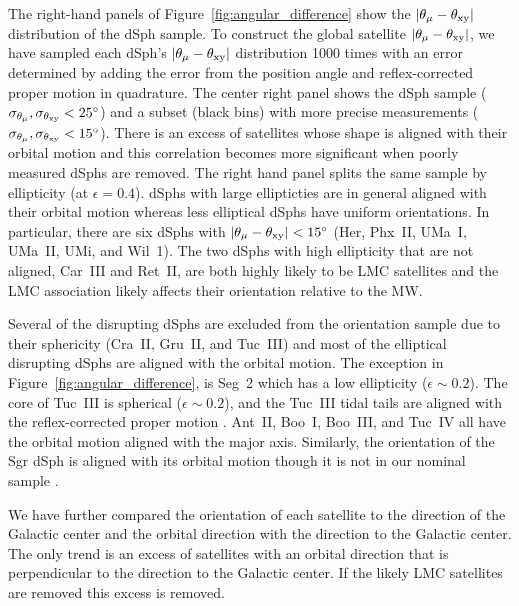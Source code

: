 \documentclass[twocolumn]{aastex63}
\newcommand{\degree}{\ensuremath{{}^{\circ}}\xspace}
\begin{document}
The right-hand panels of Figure~\ref{fig:angular_difference} show the $| \theta_{\mu}-\theta_{\rm xy} |$ distribution of the dSph sample.  To construct the global satellite $| \theta_{\mu}-\theta_{\rm xy} |$, we have sampled each dSph's  $| \theta_{\mu}-\theta_{\rm xy} |$ distribution  1000 times with an error determined by adding the error from the position angle and reflex-corrected proper motion in  quadrature.
The center right panel shows the  dSph sample  
($\sigma_{\theta_\mu}, \sigma_{\theta_{\rm xy}} < 25\degree$) and  a subset (black bins) with more precise measurements ($\sigma_{\theta_\mu}, \sigma_{\theta_{\rm xy}} < 15\degree$).
There is an excess of satellites whose shape is aligned with their orbital motion and this correlation becomes more significant when  poorly measured dSphs are removed.
The right hand panel splits the same sample by ellipticity (at $\epsilon=0.4$).
dSphs with large ellipticties  are in general aligned with their orbital motion whereas less elliptical dSphs have  uniform orientations. 
In particular, there are six dSphs with $| \theta_{\mu}-\theta_{\rm xy} |<15\degree$ (Her, Phx~II, UMa~I, UMa~II, UMi, and Wil~1). 
The  two dSphs with high ellipticity that are not aligned, Car~III and Ret~II, are both highly likely to be LMC satellites and the LMC association likely affects their orientation relative to the MW.



Several of the disrupting dSphs are excluded from the orientation sample due to their sphericity (Cra~II, Gru~II, and Tuc~III) and most of the elliptical disrupting dSphs are aligned with the orbital motion.
The exception in Figure~\ref{fig:angular_difference}, is Seg~2 which has a low ellipticity ($\epsilon \sim 0.2$).
The core of Tuc~III is spherical ($\epsilon \sim 0.2$), and the Tuc~III tidal tails are aligned with the reflex-corrected proper motion \citep{Shipp2019ApJ...885....3S}.
Ant~II, Boo~I, Boo~III, and Tuc~IV all have the orbital motion aligned with the major axis.
Similarly, the orientation of the Sgr dSph is aligned with its orbital motion though it is not in our nominal sample \citep[e.g.,][]{delPino2021ApJ...908..244D}. 

 

We have further compared the orientation of each satellite to the direction of the Galactic center and the orbital direction with the direction to the Galactic center. The only trend is an excess of satellites {with an orbital direction that is perpendicular to}   the direction to the  Galactic center. If the likely LMC satellites are removed this excess is removed. 
\end{document}
